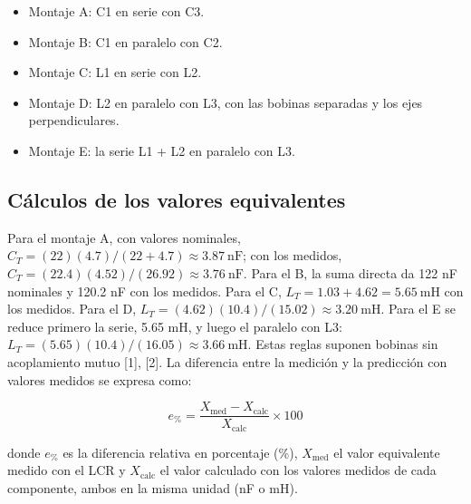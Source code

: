 \documentclass[11pt,letterpaper]{article}
\begin{document}
\begin{itemize}
  \item Montaje A: C1 en serie con C3.
  \item Montaje B: C1 en paralelo con C2.
  \item Montaje C: L1 en serie con L2.
  \item Montaje D: L2 en paralelo con L3, con las bobinas separadas y los ejes perpendiculares.
  \item Montaje E: la serie L1 + L2 en paralelo con L3.
\end{itemize}

\subsection{Cálculos de los valores equivalentes}

Para el montaje A, con valores nominales, $C_T = (22)(4.7)/(22 + 4.7) \approx 3.87\ \text{nF}$; con los medidos, $C_T = (22.4)(4.52)/(26.92) \approx 3.76\ \text{nF}$. Para el B, la suma directa da 122 nF nominales y 120.2 nF con los medidos. Para el C, $L_T = 1.03 + 4.62 = 5.65\ \text{mH}$ con los medidos. Para el D, $L_T = (4.62)(10.4)/(15.02) \approx 3.20\ \text{mH}$. Para el E se reduce primero la serie, 5.65 mH, y luego el paralelo con L3: $L_T = (5.65)(10.4)/(16.05) \approx 3.66\ \text{mH}$. Estas reglas suponen bobinas sin acoplamiento mutuo [1], [2]. La diferencia entre la medición y la predicción con valores medidos se expresa como:

\begin{equation}
  e_{\text{\%}} = \frac{X_{\mathrm{med}} - X_{\mathrm{calc}}}{X_{\mathrm{calc}}} \times 100
\end{equation}

donde $e_{\text{\%}}$ es la diferencia relativa en porcentaje (\%), $X_{\mathrm{med}}$ el valor equivalente medido con el LCR y $X_{\mathrm{calc}}$ el valor calculado con los valores medidos de cada componente, ambos en la misma unidad (nF o mH).
\end{document}
